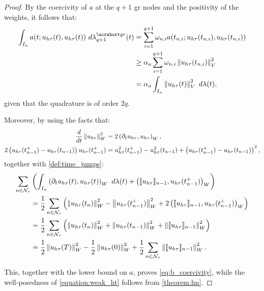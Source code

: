 \begin{proof}
    By the coercivity of $a$ at the $q + 1$ \acrshort{gr} nodes and the positivity of the weights, it follows that:
    \begin{align*}
        \int_{I_n} a(t; u_{h \tau}(t), u_{h \tau}(t)) ~ d \lambdaGR_{q + 1}(t) &= \sum_{i = 1}^{q + 1} \omega_{n, i} a(t_{n, i}; u_{h \tau}(t_{n, i}), u_{h \tau}(t_{n, i})) \\
        &\geq \CoerC{a} \sum_{i = 1}^{q + 1} \omega_{n, i} \Norm{ u_{h \tau}(t_{n, i}) }_V^2 \\
        &= \CoerC{a} \int_{I_n} \Norm{ u_{h \tau}(t) }_V^2 ~ d \lambda(t),
    \end{align*}
    given that the quadrature is of order $2q$.

    Moreover, by using the facts that:
    \begin{align*}
        \frac{d}{dt} \left\lVert  u_{h \tau}  \right\rVert_W^2 &= 2 \left( \partial_t u_{h \tau}, u_{h \tau} \right)_W, \\
        2 \left( u_{h \tau}(t_{n - 1}^+) - u_{h \tau}(t_{n - 1}) \right) u_{h \tau}(t_{n - 1}^+) &= u_{h \tau}^2(t_{n - 1}^+) - u_{h \tau}^2(t_{n - 1}) + \left( u_{h \tau}(t_{n - 1}^+) - u_{h \tau}(t_{n - 1}) \right)^2,
    \end{align*}
    together with \cref{def:time_jumps}:
    \begin{align*}
        \sum_{n \in \mathcal{N}_{\tau}} &\left( \int_{I_n} \left( \partial_t u_{h \tau}(t), u_{h \tau}(t) \right)_W ~ d \lambda(t) + \left( \llbracket u_{h \tau} \rrbracket_{n - 1}, u_{h \tau}(t_{n - 1}^+) \right)_W \right) \\
        &= \frac12 \sum_{n \in \mathcal{N}_{\tau}} \left( \left\lVert  u_{h \tau}(t_n)  \right\rVert_W^2 - \left\lVert  u_{h \tau}(t_{n - 1}^+)  \right\rVert_W^2 + 2 \left( \llbracket u_{h \tau} \rrbracket_{n - 1}, u_{h \tau}(t_{n - 1}^+) \right)_W \right) \\
        &= \frac12 \sum_{n \in \mathcal{N}_{\tau}} \left( \left\lVert  u_{h \tau}(t_n)  \right\rVert_W^2 + \left\lVert  u_{h \tau}(t_{n - 1})  \right\rVert_W^2 + \left\lVert  \llbracket u_{h \tau} \rrbracket_{n - 1}  \right\rVert_W^2 \right) \\
        &= \frac12 \left\lVert  u_{h \tau}(T)  \right\rVert_W^2 - \frac12 \left\lVert  u_{h \tau}(0)  \right\rVert_W^2 + \frac12 \sum_{n \in \mathcal{N}_{\tau}} \left\lVert  \llbracket u_{h \tau} \rrbracket_{n - 1}  \right\rVert_W^2.
    \end{align*}

    This, together with the lower bound on $a$, proves \cref{eq:b_coercivity}, while the well-posedness of \cref{equation:weak_ht} follows from \cref{theorem:lm}.
\end{proof}

